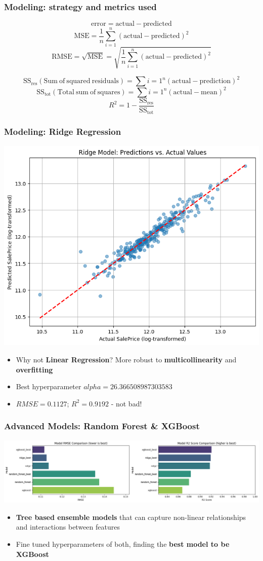 \documentclass{beamer}
\begin{document}
\begin{frame}
\frametitle{Modeling: strategy and metrics used}

\footnotesize
$$\mathrm{error}=\mathrm{actual}-\mathrm{predicted}$$
$$\mathrm{MSE}=\frac{1}{n}\sum_{i=1}^{n}(\mathrm{actual}-\mathrm{predicted})^2$$
$$\mathrm{RMSE}=\sqrt{\mathrm{MSE}}=\sqrt{\frac{1}{n}\sum_{i=1}^{n}(\mathrm{actual}-\mathrm{predicted})^2}$$

$$\mathrm{SS}_{\mathrm{res}}(\mathrm{Sum\ of\ squared\ residuals})=\sum{i=1}^{n}(\mathrm{actual}-\mathrm{prediction})^2$$
$$\mathrm{SS}_{\mathrm{tot}}(\mathrm{Total\ sum\ of\ squares})=\sum{i=1}^{n}(\mathrm{actual}-\mathrm{mean})^2$$
$$R^2=1-\frac{\mathrm{SS}_{\mathrm{res}}}{\mathrm{SS}_{\mathrm{tot}}}$$
\normalsize
\end{frame}


\begin{frame}
\frametitle{Modeling: Ridge Regression}
\centering
    \includegraphics[width=.7\textwidth]{../challenge/main_files/main_45_0.png}

\begin{itemize}
    \item Why not \textbf{Linear Regression}? More robust to \textbf{multicollinearity} and \textbf{overfitting}
    \item Best hyperparameter $alpha=26.366508987303583$
    \item $RMSE = 0.1127$; $R^2 = 0.9192$ - not bad!
\end{itemize}
\end{frame}

\begin{frame}
\frametitle{Advanced Models: Random Forest \& XGBoost}
\centering
    \includegraphics[width=.7\textwidth]{../challenge/main_files/main_73_0.png}

\begin{itemize}
    \item \textbf{Tree based ensemble models} that can capture non-linear relationships and interactions between features
    \item Fine tuned hyperparameters of both, finding the \textbf{best model to be XGBoost}
\end{itemize}
\end{frame}
\end{document}
